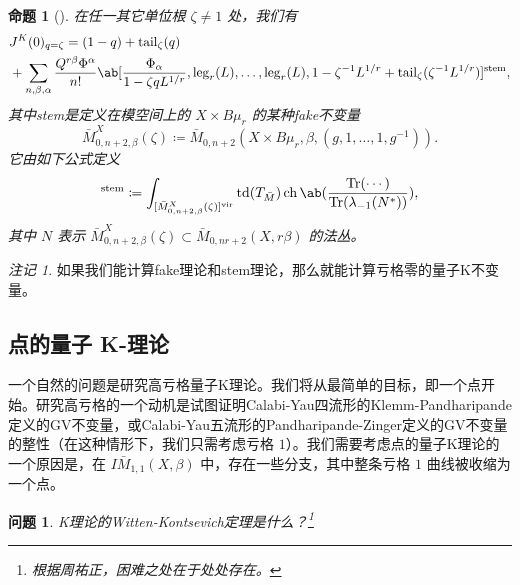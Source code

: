 \documentclass{amsart}
\newtheorem{prop}[thm]{命题}
\newtheorem{quest}[thm]{问题}
\theoremstyle{definition}
\theoremstyle{remark}
\newtheorem{rmk}[thm]{注记}
\theoremstyle{plain}
\theoremstyle{definition}
\theoremstyle{remark}
\newcommand{\mr}[1]{\mathrm{#1}}
\newcommand{\on}[1]{\operatorname{#1}}
\newcommand{\1}{\mathbf{1}}
\newcommand{\2}{\mathbf{2}}
\newcommand{\3}{\mathbf{3}}
\newcommand{\vir}{\mr{vir}}
\begin{document}
\begin{prop}[{\cite{GiventalTonita2014}}]
    在任一其它单位根 \(\zeta \neq 1\) 处，我们有
    \begin{align*}
        &J^K(0)_{q = \zeta} = (1-q) + \mr{tail}_{\zeta}(q) \\
        &+ \sum_{n,\beta,\alpha} \frac{Q^{r\beta}\Phi^{\alpha}}{n!} \ab[\frac{\Phi_{\alpha}}{1-\zeta q L^{1/r}}, \mr{leg}_r(L), \ldots, \mr{leg}_r(L), 1 - \zeta^{-1}L^{1/r} + \mr{tail}_{\zeta}(\zeta^{-1} L^{1/r})]^{\mr{stem}},
    \end{align*}
    其中stem是定义在模空间上的 \(X \times B\mu_r\) 的某种fake不变量
    \[ \bar{M}_{0,n+2,\beta}^X(\zeta) \coloneqq \bar{M}_{0,n+2}(X \times B\mu_r, \beta, (g, 1, \ldots, 1, g^{-1})). \]
    它由如下公式定义
    \begin{align*}
        [\cdots]^{\mr{stem}} \coloneqq \int_{[\bar{M}_{0,n+2,\beta}^X(\zeta)]^{\vir}} \on{td}(T_{\bar{M}}) \on{ch}\ab(\frac{\on{Tr}(\cdots)}{\on{Tr}(\lambda_{-1}(N^*))}),
    \end{align*}
    其中 \(N\) 表示 \(\bar{M}_{0,n+2,\beta}^X(\zeta) \subset \bar{M}_{0,nr+2}(X, r\beta)\) 的法丛。
\end{prop}

\begin{rmk}
    如果我们能计算fake理论和stem理论，那么就能计算亏格零的量子K不变量。
\end{rmk}

\subsection{点的量子 K-理论}%
\label{sub:Quantum K-theory of a point}

一个自然的问题是研究高亏格量子K理论。我们将从最简单的目标，即一个点开始。研究高亏格的一个动机是试图证明Calabi-Yau四流形的Klemm-Pandharipande定义的GV不变量，或Calabi-Yau五流形的Pandharipande-Zinger定义的GV不变量的整性（在这种情形下，我们只需考虑亏格 \(1\)）。我们需要考虑点的量子K理论的一个原因是，在 \(I\bar{M}_{1,1}(X, \beta)\) 中，存在一些分支，其中整条亏格 \(1\) 曲线被收缩为一个点。

\begin{quest}
    K理论的Witten-Kontsevich定理是什么？\footnote{根据周祐正，困难之处在于处处存在。}
\end{quest}
\end{document}
